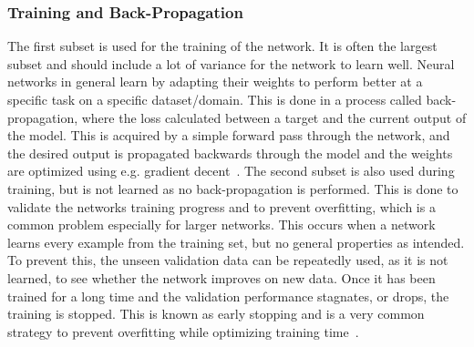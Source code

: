 \subsubsection{Training and Back-Propagation}
The first subset is used for the training of the network. It is often the largest subset and should include a lot of variance for the network to learn well. Neural networks in general learn by adapting their weights to perform better at a specific task on a specific dataset/domain. This is done in a process called back-propagation, where the loss calculated between a target and the current output of the model. This is acquired by a simple forward pass through the network, and the desired output is propagated backwards through the model and the weights are optimized using e.g. gradient decent~\cite{CNN2}. The second subset is also used during training, but is not learned as no back-propagation is performed. This is done to validate the networks training progress and to prevent overfitting, which is a common problem especially for larger networks. This occurs when a network learns every example from the training set, but no general properties as intended. To prevent this, the unseen validation data can be repeatedly used, as it is not learned, to see whether the network improves on new data. Once it has been trained for a long time and the validation performance stagnates, or drops, the training is stopped. This is known as early stopping and is a very common strategy to prevent overfitting while optimizing training time~\cite{CNN1}.

